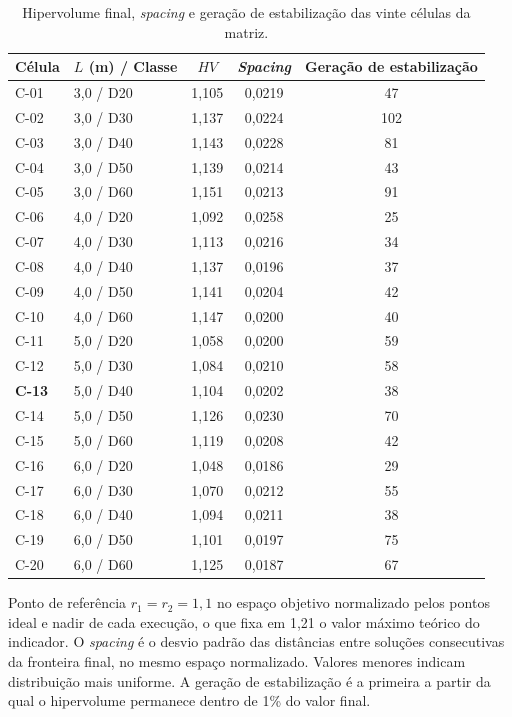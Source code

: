 \begin{table}[!ht]
\caption{Hipervolume final, \textit{spacing} e geração de estabilização das vinte células da matriz.\label{tab:hv}}
\begin{threeparttable}
\begin{tabular*}{\columnwidth}{@{\extracolsep\fill}llccc@{\extracolsep\fill}}
\toprule
Célula & $L$ (m) / Classe & $HV$ & \textit{Spacing} & Geração de estabilização \\
\midrule
C-01 & 3{,}0 / D20 & 1{,}105 & 0{,}0219 & 47 \\
C-02 & 3{,}0 / D30 & 1{,}137 & 0{,}0224 & 102 \\
C-03 & 3{,}0 / D40 & 1{,}143 & 0{,}0228 & 81 \\
C-04 & 3{,}0 / D50 & 1{,}139 & 0{,}0214 & 43 \\
C-05 & 3{,}0 / D60 & 1{,}151 & 0{,}0213 & 91 \\
\midrule
C-06 & 4{,}0 / D20 & 1{,}092 & 0{,}0258 & 25 \\
C-07 & 4{,}0 / D30 & 1{,}113 & 0{,}0216 & 34 \\
C-08 & 4{,}0 / D40 & 1{,}137 & 0{,}0196 & 37 \\
C-09 & 4{,}0 / D50 & 1{,}141 & 0{,}0204 & 42 \\
C-10 & 4{,}0 / D60 & 1{,}147 & 0{,}0200 & 40 \\
\midrule
C-11 & 5{,}0 / D20 & 1{,}058 & 0{,}0200 & 59 \\
C-12 & 5{,}0 / D30 & 1{,}084 & 0{,}0210 & 58 \\
\textbf{C-13} & 5{,}0 / D40 & 1{,}104 & 0{,}0202 & 38 \\
C-14 & 5{,}0 / D50 & 1{,}126 & 0{,}0230 & 70 \\
C-15 & 5{,}0 / D60 & 1{,}119 & 0{,}0208 & 42 \\
\midrule
C-16 & 6{,}0 / D20 & 1{,}048 & 0{,}0186 & 29 \\
C-17 & 6{,}0 / D30 & 1{,}070 & 0{,}0212 & 55 \\
C-18 & 6{,}0 / D40 & 1{,}094 & 0{,}0211 & 38 \\
C-19 & 6{,}0 / D50 & 1{,}101 & 0{,}0197 & 75 \\
C-20 & 6{,}0 / D60 & 1{,}125 & 0{,}0187 & 67 \\
\bottomrule
\end{tabular*}
\begin{tablenotes}
\footnotesize
\item Ponto de referência $r_1 = r_2 = 1{,}1$ no espaço objetivo normalizado pelos pontos ideal e nadir de cada execução, o que fixa em 1{,}21 o valor máximo teórico do indicador.
O \textit{spacing} é o desvio padrão das distâncias entre soluções consecutivas da fronteira final, no mesmo espaço normalizado. Valores menores indicam distribuição mais uniforme.
A geração de estabilização é a primeira a partir da qual o hipervolume permanece dentro de 1\% do valor final.
\end{tablenotes}
\end{threeparttable}
\end{table}

